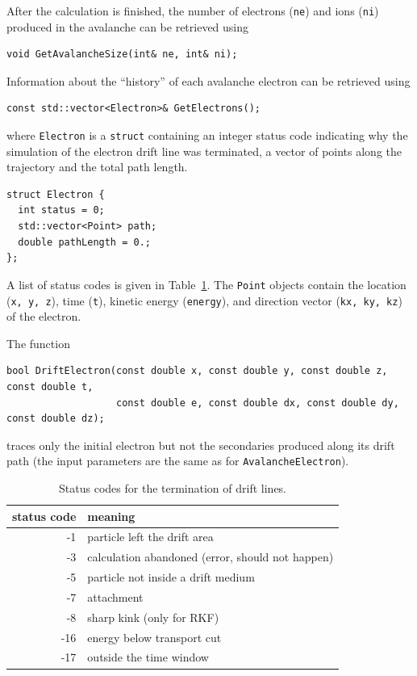 After the calculation is finished, the number of electrons 
(\texttt{ne}) and ions (\texttt{ni})  
produced in the avalanche can be retrieved using
\begin{lstlisting}
void GetAvalancheSize(int& ne, int& ni);
\end{lstlisting}
Information about the ``history'' of each avalanche electron can be retrieved using
\begin{lstlisting}
const std::vector<Electron>& GetElectrons();
\end{lstlisting}
where \texttt{Electron} is a \texttt{struct} containing an integer status code indicating why the simulation of the electron drift line was terminated, a vector of points along the trajectory and the total path length. 
\begin{lstlisting}
struct Electron {
  int status = 0;
  std::vector<Point> path;
  double pathLength = 0.;
};
\end{lstlisting}
A list of status codes is given in Table~\ref{Tab:DriftLineStatusCodes}.
The \texttt{Point} objects contain the location (\texttt{x, y, z}), time (\texttt{t}), kinetic energy (\texttt{energy}), and direction vector (\texttt{kx, ky, kz}) of the electron.

The function
\begin{lstlisting}
bool DriftElectron(const double x, const double y, const double z, const double t,
                   const double e, const double dx, const double dy, const double dz);
\end{lstlisting}
traces only the initial electron but not the secondaries 
produced along its drift path 
(the input parameters are the same as for \texttt{AvalancheElectron}).

\begin{table}
  \centering
  \caption{Status codes for the termination of drift lines.}
  \label{Tab:DriftLineStatusCodes}
  \begin{tabular}{r l}
    \toprule
    status code &  meaning\\
    \midrule
     -1 & particle left the drift area        \\
     -3 & calculation abandoned (error, should not happen) \\
     -5 & particle not inside a drift medium  \\
     -7 & attachment                          \\
     -8 & sharp kink (only for RKF)           \\
    -16 & energy below transport cut          \\
    -17 & outside the time window             \\
    \bottomrule
  \end{tabular}
\end{table}

